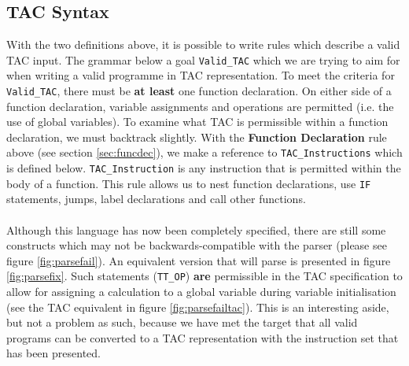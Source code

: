 \subsection{TAC Syntax}
With the two definitions above, it is possible to write rules which describe a valid TAC input. The grammar below a goal \verb!Valid_TAC! which we are trying to aim for when writing a valid programme in TAC representation. To meet the criteria for \verb!Valid_TAC!, there must be \textbf{at least} one function declaration. On either side of a function declaration, variable assignments and operations are permitted (i.e. the use of global variables). To examine what TAC is permissible within a function declaration, we must backtrack slightly. With the \textbf{Function Declaration} rule above (see section \ref{sec:funcdec}), we make a reference to \verb!TAC_Instructions! which is defined below. \verb!TAC_Instruction! is any instruction that is permitted within the body of a function. This rule allows us to nest function declarations, use \verb!IF! statements, jumps, label declarations and call other functions.
\ \\ \ \\
Although this language has now been completely specified, there are still some constructs which may not be backwards-compatible with the \mmc parser (please see figure \ref{fig:parsefail}). An equivalent version that will parse is presented in figure \ref{fig:parsefix}. Such statements (\verb!TT_OP!) \textbf{are} permissible in the TAC specification to allow for assigning a calculation to a global variable during variable initialisation (see the TAC equivalent in figure \ref{fig:parsefailtac}). This is an interesting aside, but not a problem as such, because we have met the target that all valid \mmc programs can be converted to a TAC representation with the instruction set that has been presented.

